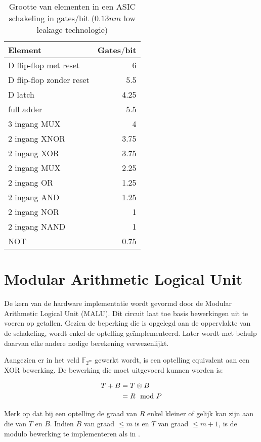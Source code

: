 \begin{table}[h]
	\caption{Grootte van elementen in een ASIC schakeling in gates$/$bit ($0.13 nm$ low leakage technologie)\cite{cell-databook}}
	\label{tabel-implementatie-beperkingen-elementen-gatecount}
	\begin{tabular}{|l|r|}
		\hline
		Element			& Gates$/$bit\\
		\hline
		D flip-flop met reset	& 6\\
		D flip-flop zonder reset	& 5.5\\
		D latch			& 4.25\\
		full adder		& 5.5\\
		3 ingang MUX	& 4\\
		2 ingang XNOR	& 3.75\\
		2 ingang XOR	& 3.75\\
		2 ingang MUX	& 2.25\\
		2 ingang OR		& 1.25\\
		2 ingang AND	& 1.25\\
		2 ingang NOR	& 1\\
		2 ingang NAND	& 1\\
		NOT				& 0.75\\
		\hline		
	\end{tabular}
\end{table}

\section{Modular Arithmetic Logical Unit}

De kern van de hardware implementatie wordt gevormd door de Modular Arithmetic Logical Unit (MALU)\cite{sakiyama}. Dit circuit laat toe basis bewerkingen uit te voeren op getallen. Gezien de beperking die is opgelegd aan de oppervlakte van de schakeling, wordt enkel de optelling ge\"implementeerd. Later wordt met behulp daarvan elke andere nodige berekening verwezenlijkt.

Aangezien er in het veld $\mathbb{F}_{2^m}$ gewerkt wordt, is een optelling equivalent aan een XOR bewerking. De bewerking die moet uitgevoerd kunnen worden is:

\[\begin{aligned}
T + B	&= T \otimes B\\
		&= R \mod P
\end{aligned}\]

Merk op dat bij een optelling de graad van $R$ enkel kleiner of gelijk kan zijn aan die van $T$ en $B$. Indien $B$ van graad $\leq m$ is en $T$ van graad $\leq m + 1$, is de modulo bewerking te implementeren als in .

